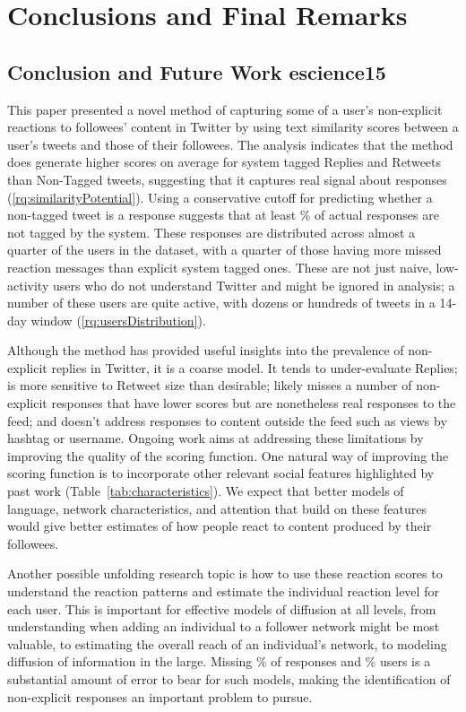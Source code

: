 \chapter{Conclusions and Final Remarks}
\label{ch:conclusions}

\section{Conclusion and Future Work escience15}

This paper presented a novel method of capturing some of a user's non-explicit reactions to followees' content in Twitter by using text similarity scores between a user's tweets and those of their followees.  The analysis indicates that the method does generate higher scores on average for system tagged Replies and Retweets than Non-Tagged tweets, suggesting that it captures real signal about responses (\ref{rq:similarityPotential}).  Using a conservative cutoff for predicting whether a non-tagged tweet is a response suggests that at least \highNonTaggedTweetCountPct{}\% of actual responses are not tagged by the system.  These responses are distributed across almost a quarter of the users in the dataset, with a quarter of those having more missed reaction messages than explicit system tagged ones. These are not just naive, low-activity users who do not understand Twitter and might be ignored in analysis; a number of these users are quite active, with dozens or hundreds of tweets in a 14-day window (\ref{rq:usersDistribution}).  

Although the method has provided useful insights into the prevalence of non-explicit replies in Twitter, it is a coarse model.  It tends to under-evaluate Replies; is more sensitive to Retweet size than desirable; likely misses a number of non-explicit responses that have lower scores but are nonetheless real responses to the feed; and doesn't address responses to content outside the feed such as views by hashtag or username.  Ongoing work aims at addressing these limitations by improving the quality of the scoring function.  One natural way of improving the scoring function is to incorporate other relevant social features highlighted by past work (Table~\ref{tab:characteristics}).  We expect that better models of language, network characteristics, and attention that build on these features would give better estimates of how people react to content produced by their followees.

Another possible unfolding research topic is how to use these reaction scores to understand the reaction patterns and estimate the individual reaction level for each user.  This is important for effective models of diffusion at all levels, from understanding when adding an individual to a follower network might be most valuable, to estimating the overall reach of an individual's network, to modeling diffusion of information in the large.  Missing \highNonTaggedTweetCountPct{}\% of responses and \usersAboveLinePct{}\% users is a substantial amount of error to bear for such models, making the identification of non-explicit responses an important problem to pursue.


